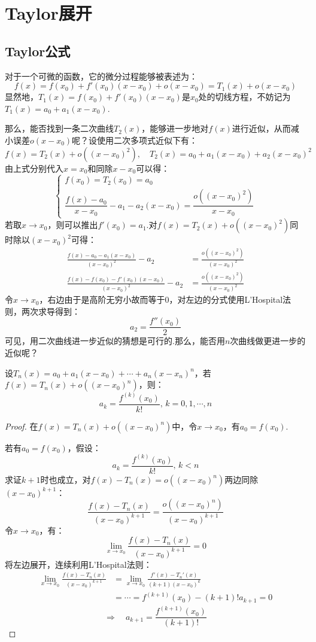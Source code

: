 \section{Taylor展开}
\subsection{Taylor公式}
对于一个可微的函数，它的微分过程能够被表述为：
\[f(x) = f(x_0) + f'(x_0)(x-x_0) + o(x-x_0) = T_1(x) + o(x-x_0)\]
显然地，$T_1(x) = f(x_0) + f'(x_0)(x-x_0)$是$x_0$处的切线方程，不妨记为$T_1(x) = a_0 + a_1(x-x_0)$.

那么，能否找到一条二次曲线$T_2(x)$，能够进一步地对$f(x)$进行近似，从而减小误差$o(x-x_0)$呢？设使用二次多项式近似下有：
\[f(x) = T_2(x) + o((x-x_0)^2),\quad T_2(x) = a_0 + a_1(x-x_0) + a_2(x-x_0)^2\]
由上式分别代入$x=x_0$和同除$x-x_0$可以得：
\[\begin{cases}
    f(x_0) = T_2(x_0) = a_0 \\
    \dfrac{f(x)-a_0}{x-x_0} - a_1 - a_2(x-x_0) = \dfrac{o((x-x_0)^2)}{x-x_0}
\end{cases}\]
若取$x \to x_0$，则可以推出$f'(x_0) = a_1$.对$f(x) = T_2(x) + o((x-x_0)^2)$同时除以$(x-x_0)^2$可得：
\begin{align*}
    \frac{f(x)-a_0-a_1(x-x_0)}{(x-x_0)^2} - a_2 &= \frac{o((x-x_0)^2)}{(x-x_0)^2} \\
    \frac{f(x)-f(x_0)-f'(x_0)(x-x_0)}{(x-x_0)^2} - a_2 &= \frac{o((x-x_0)^2)}{(x-x_0)^2}
\end{align*}
令$x \to x_0$，右边由于是高阶无穷小故而等于$0$，对左边的分式使用L'Hospital法则，两次求导得到：
\[a_2 = \frac{f''(x_0)}{2}\]
可见，用二次曲线进一步近似的猜想是可行的.那么，能否用$n$次曲线做更进一步的近似呢？

\begin{proposition}
    设$T_n(x) = a_0 + a_1(x-x_0) + \cdots + a_n(x-x_n)^n$，若$f(x) = T_n(x) + o((x-x_0)^n)$，则：
    \[a_k = \frac{f^{(k)}(x_0)}{k!},\,k=0,1,\cdots,n\]
\end{proposition}

\begin{proof}
    在$f(x) = T_n(x) + o((x-x_0)^n)$中，令$x \to x_0$，有$a_0 = f(x_0)$.

    若有$a_0=f(x_0)$，假设：
    \[a_k = \frac{f^{(k)}(x_0)}{k!},\,k<n\]
    求证$k+1$时也成立，对$f(x)-T_n(x) = o((x-x_0)^n)$两边同除$(x-x_0)^{k+1}$：
    \[\frac{f(x)-T_n(x)}{(x-x_0)^{k+1}} = \frac{o((x-x_0)^n)}{(x-x_0)^{k+1}}\]
    令$x \to x_0$，有：
    \[\lim\limits_{x \to x_0}\frac{f(x)-T_n(x)}{(x-x_0)^{k+1}} = 0\]
    将左边展开，连续利用L'Hospital法则：
    \begin{align*}
        \lim\limits_{x \to x_0}\frac{f(x)-T_n(x)}{(x-x_0)^{k+1}} &= \lim\limits_{x \to x_0}\frac{f'(x)-T_n'(x)}{(k+1)(x-x_0)^k}\\
        &= \cdots = f^{(k+1)}(x_0) - (k+1)!a_{k+1} = 0
    \end{align*}
    \[\Rightarrow\quad a_{k+1} = \frac{f^{(k+1)}(x_0)}{(k+1)!}\]
\end{proof}

